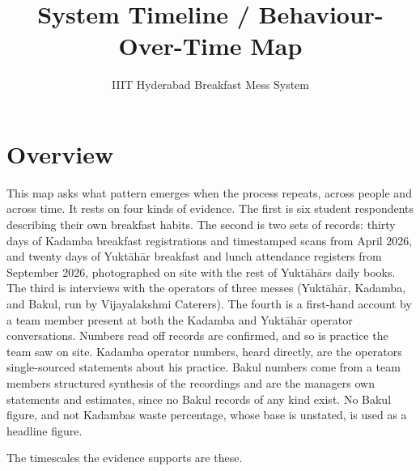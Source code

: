 \documentclass[
  10pt,
  table]{article}
\title{System Timeline / Behaviour-Over-Time Map}
\subtitle{IIIT Hyderabad Breakfast Mess System}
\author{}
\date{}
\makeatletter
\gdef\psubtitle{}
\renewcommand{\maketitle}{%
  \begingroup\raggedright
  {\color{pblue}\fontsize{24}{27}\selectfont\bfseries \@title\par}
  \vspace{3pt}{\color{pblue}\rule{\linewidth}{2.4pt}}\par\vspace{5pt}
  {\color{pslate}\large \psubtitle\par}
  \vspace{4pt}
  \endgroup}
\makeatother
\begin{document}
\maketitle

\renewcommand*\contentsname{Contents}
{
\hypersetup{linkcolor=pslate}
\setcounter{tocdepth}{2}
\tableofcontents
}
\section{Overview}\label{overview}

This map asks what pattern emerges when the process repeats, across people and across time. It rests on four kinds of evidence. The first is six student respondents describing their own breakfast habits. The second is two sets of records: thirty days of Kadamba breakfast registrations and timestamped scans from April 2026, and twenty days of Yuktāhār breakfast and lunch attendance registers from September 2026, photographed on site with the rest of Yuktāhār\textquotesingle s daily books. The third is interviews with the operators of three messes (Yuktāhār, Kadamba, and Bakul, run by Vijayalakshmi Caterers). The fourth is a first-hand account by a team member present at both the Kadamba and Yuktāhār operator conversations. Numbers read off records are confirmed, and so is practice the team saw on site. Kadamba operator numbers, heard directly, are the operator\textquotesingle s single-sourced statements about his practice. Bakul numbers come from a team member\textquotesingle s structured synthesis of the recordings and are the manager\textquotesingle s own statements and estimates, since no Bakul records of any kind exist. No Bakul figure, and not Kadamba\textquotesingle s waste percentage, whose base is unstated, is used as a headline figure.

The timescales the evidence supports are these.
\end{document}

